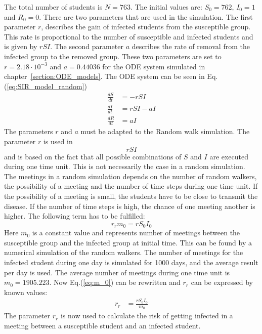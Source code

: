 \documentclass[%
twoside,                 %
final,                   %
chapterprefix=true,      %
open=right               %
10pt]{book}
\begin{document}
\noindent
The total number of students is $N=763$. The initial values are: $S_0=762$, $I_0=1$ and $R_0=0$. There are two parameters that are used in the simulation. The first parameter $r$, describes the gain of infected students from the susceptible group. This rate is proportional to the number of susceptible and infected students and is given by $rSI$. The second parameter $a$ describes the rate of removal from the infected group to the removed group. These two parameters are set to $r=2.18\cdot 10^{-3}$ and $a=0.44036$ for the ODE system simulated in chapter~\ref{section:ODE_models}. The ODE system can be seen in Eq.(\ref{eq:SIR_model_random})
\begin{equation} \label{eq:SIR_model_random}
	\begin{aligned} 
	\frac{dS}{dt} &= -rSI \\ 
	\frac{dI}{dt} &= rSI-aI \\ 
	\frac{dR}{dt} &= aI 
	\end{aligned}
\end{equation}
The parameters $r$ and $a$ must be adapted to the Random walk simulation. The parameter $r$ is used in
\begin{equation} \label{eq:rSI}
rSI
\end{equation}
and is based on the fact that all possible combinations of $S$ and $I$ are executed during one time unit. This is not necessarily the case in a random simulation. The meetings in a random simulation depends on the number of random walkers, the possibility of a meeting and the number of time steps during one time unit. If the possibility of a meeting is small, the students have to be close to transmit the disease. If the number of time steps is high, the chance of one meeting another is higher. The following term has to be fulfilled: 
\begin{equation} \label{eq:m_0}
r_r m_0 = rS_0I_0
\end{equation}
Here $m_0$ is a constant value and represents number of meetings between the susceptible group and the infected group at initial time. This can be found by a numerical simulation of the random walkers. The number of meetings for the infected student during one day is simulated for 1000 days, and the average result per day is used. The average number of meetings during one time unit is $m_0=1905.223$. Now Eq.(\ref{eq:m_0}) can be rewritten and $r_r$ can be expressed by known values: 
\begin{equation} \label{eq:m_0_2}
	\begin{aligned} 
	r_r &= \frac{rS_0I_0}{m_0}
	\end{aligned}
\end{equation}
The parameter $r_r$ is now used to calculate the risk of getting infected in a meeting between a susceptible student and an infected student. 
\end{document}

